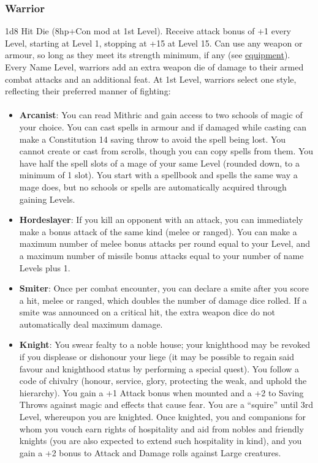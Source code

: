 \documentclass{book}
\providecommand{\tightlist}{%
\setlength{\itemsep}{0pt}\setlength{\parskip}{0pt}}
\begin{document}
\subsubsection*{Warrior}\label{warrior}

1d8 Hit Die (8hp+Con mod at 1st Level). Receive attack bonus of +1 every
Level, starting at Level 1, stopping at +15 at Level 15. Can use any
weapon or armour, so long as they meet its strength minimum, if any (see
\hyperref[armour-weapons-and-equipment]{equipment}). Every Name Level,
warriors add an extra weapon die of damage to their armed combat attacks
and an additional feat. At 1st Level, warriors select one style,
reflecting their preferred manner of fighting:

\paragraph{}

\begin{itemize}
\tightlist
\item
  \textbf{Arcanist}: You can read Mithric and gain access to two schools
  of magic of your choice. You can cast spells in armour and if damaged
  while casting can make a Constitution 14 saving throw to avoid the
  spell being lost. You cannot create or cast from scrolls, though you
  can copy spells from them. You have half the spell slots of a mage of
  your same Level (rounded down, to a minimum of 1 slot). You start with
  a spellbook and spells the same way a mage does, but no schools or
  spells are automatically acquired through gaining Levels.
\item
  \textbf{Hordeslayer}: If you kill an opponent with an attack, you can
  immediately make a bonus attack of the same kind (melee or ranged).
  You can make a maximum number of melee bonus attacks per round equal
  to your Level, and a maximum number of missile bonus attacks equal to
  your number of name Levels plus 1.
\item
  \textbf{Smiter}: Once per combat encounter, you can declare a smite
  after you score a hit, melee or ranged, which doubles the number of
  damage dice rolled. If a smite was announced on a critical hit, the
  extra weapon dice do not automatically deal maximum damage.
\item
  \textbf{Knight}: You swear fealty to a noble house; your knighthood
  may be revoked if you displease or dishonour your liege (it may be
  possible to regain said favour and knighthood status by performing a
  special quest). You follow a code of chivalry (honour, service, glory,
  protecting the weak, and uphold the hierarchy). You gain a +1 Attack
  bonus when mounted and a +2 to Saving Throws against magic and effects
  that cause fear. You are a ``squire'' until 3rd Level, whereupon you
  are knighted. Once knighted, you and companions for whom you vouch
  earn rights of hospitality and aid from nobles and friendly knights
  (you are also expected to extend such hospitality in kind), and you
  gain a +2 bonus to Attack and Damage rolls against Large creatures.
\end{itemize}
\end{document}
